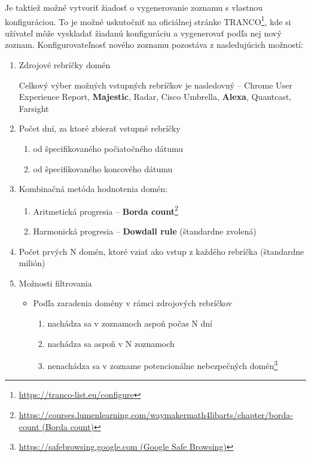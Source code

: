Je taktiež možné vytvoriť žiadosť o vygenerovanie zoznamu s vlastnou konfiguráciou. 
To je možné uskutočniť na oficiálnej stránke TRANCO\footnote{\href{https://tranco-list.eu/configure}{https://tranco-list.eu/configure}},
kde si užívateľ môže vyskladať žiadanú konfiguráciu a vygenerovať podľa nej nový zoznam.
Konfigurovateľnosť nového zoznamu pozostáva z nasledujúcich možností: \cite{tranco-config}
\begin{enumerate}
    \item Zdrojové rebríčky domén
    
    Celkový výber možných vstupných rebríčkov je nasledovný -- Chrome User Experience Report, \textbf{Majestic}, Radar, Cisco Umbrella, \textbf{Alexa}, Quantcast, Farsight
    
    \item Počet dní, za ktoré zbierať vstupné rebríčky
    \begin{enumerate}
        \item od špecifikovaného počiatočného dátumu
        \item od špecifikovaného koncového dátumu
    \end{enumerate}

    \item Kombinačná metóda hodnotenia domén:
    \begin{enumerate}
        \item Aritmetická progresia -- \textbf{Borda count}\footnote{\href{https://courses.lumenlearning.com/waymakermath4libarts/chapter/borda-count}{https://courses.lumenlearning.com/waymakermath4libarts/chapter/borda-count (Borda count)}}
        \item Harmonická progresia -- \textbf{Dowdall rule} (štandardne zvolená)
    \end{enumerate}

    \item Počet prvých N domén, ktoré vziať ako vstup z každého rebríčka (štandardne milión)

    \item Možnosti filtrovania
    \begin{itemize}
        \item Podľa zaradenia domény v rámci zdrojových rebríčkov
        \begin{enumerate}
            \item nachádza sa v zoznamoch aspoň počas N dní
            \item nachádza sa aspoň v N zoznamoch
            \item nenachádza sa v zozname potencionálne nebezpečných domén\footnote{\href{https://safebrowsing.google.com}{https://safebrowsing.google.com (Google Safe Browsing)}}
        \end{enumerate}


\end{itemize}
\end{enumerate}
